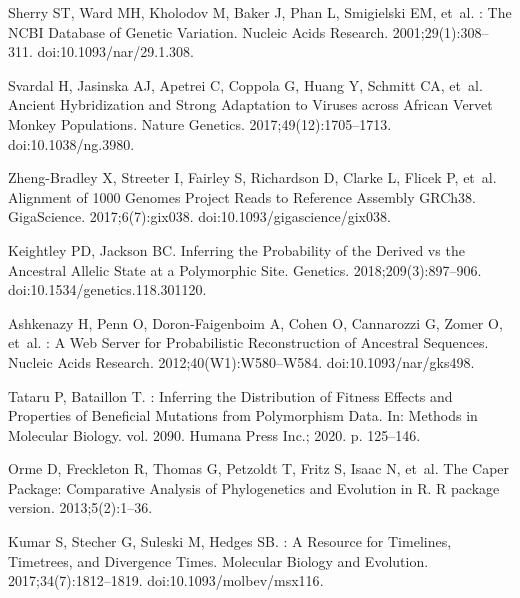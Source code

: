 \documentclass[10pt,letterpaper]{article}
\providecommand{\DIFdelbegin}{} %
\newcommand{\DIFscaledelfig}{0.5}
\newlength{\DIFdelgraphicswidth} %
\newlength{\DIFdelgraphicsheight} %
\newcommand{\DIFdelincludegraphics}[2][]{%
\sbox{\DIFdelgraphicsbox}{\DIFOincludegraphics[#1]{#2}}%
\settoboxwidth{\DIFdelgraphicswidth}{\DIFdelgraphicsbox} %
\settoboxtotalheight{\DIFdelgraphicsheight}{\DIFdelgraphicsbox} %
\scalebox{\DIFscaledelfig}{%
\parbox[b]{\DIFdelgraphicswidth}{\usebox{\DIFdelgraphicsbox}\\[-\baselineskip] \rule{\DIFdelgraphicswidth}{0em}}\llap{\resizebox{\DIFdelgraphicswidth}{\DIFdelgraphicsheight}{%
\setlength{\unitlength}{\DIFdelgraphicswidth}%
\begin{picture}(1,1)%
\thicklines\linethickness{2pt} %
{\color[rgb]{1,0,0}\put(0,0){\framebox(1,1){}}}%
{\color[rgb]{1,0,0}\put(0,0){\line( 1,1){1}}}%
{\color[rgb]{1,0,0}\put(0,1){\line(1,-1){1}}}%
\end{picture}%
}\hspace*{3pt}}} %
} %
\DeclareRobustCommand{\DIFdelbegin}{\DIFOdelbegin \let\includegraphics\DIFdelincludegraphics} %
\begin{document}
\begin{thebibliography}{10}
Sherry ST, Ward MH, Kholodov M, Baker J, Phan L, Smigielski EM, et~al.
: The {{NCBI}} Database of Genetic Variation.
\newblock Nucleic Acids Research. 2001;29(1):308--311.
\newblock doi:{10.1093/nar/29.1.308}.

Svardal H, Jasinska AJ, Apetrei C, Coppola G, Huang Y, Schmitt CA, et~al.
\newblock Ancient Hybridization and Strong Adaptation to Viruses across
{{African}} Vervet Monkey Populations.
\newblock Nature Genetics. 2017;49(12):1705--1713.
\newblock doi:{10.1038/ng.3980}.

{Zheng-Bradley} X, Streeter I, Fairley S, Richardson D, Clarke L, Flicek P,
et~al.
\newblock Alignment of 1000 {{Genomes Project}} Reads to Reference Assembly
{{GRCh38}}.
\newblock GigaScience. 2017;6(7):gix038.
\newblock doi:{10.1093/gigascience/gix038}.

Keightley PD, Jackson BC.
\newblock Inferring the Probability of the Derived vs the Ancestral Allelic
State at a Polymorphic Site.
\newblock Genetics. 2018;209(3):897--906.
\newblock doi:{10.1534/genetics.118.301120}.

Ashkenazy H, Penn O, {Doron-Faigenboim} A, Cohen O, Cannarozzi G, Zomer O,
et~al.
: A Web Server for Probabilistic Reconstruction of
Ancestral Sequences.
\newblock Nucleic Acids Research. 2012;40(W1):W580--W584.
\newblock doi:{10.1093/nar/gks498}.

Tataru P, Bataillon T.
: {{Inferring}} the Distribution of Fitness Effects and
Properties of Beneficial Mutations from Polymorphism Data.
\newblock In: Methods in {{Molecular Biology}}. vol. 2090. Humana Press Inc.;
2020. p. 125--146.

Orme D, Freckleton R, Thomas G, Petzoldt T, Fritz S, Isaac N, et~al.
\newblock The Caper Package: Comparative Analysis of Phylogenetics and
Evolution in {{R}}.
\newblock R package version. 2013;5(2):1--36.

Kumar S, Stecher G, Suleski M, Hedges SB.
: A Resource for Timelines, Timetrees, and Divergence
Times.
\newblock Molecular Biology and Evolution. 2017;34(7):1812--1819.
\newblock doi:{10.1093/molbev/msx116}.

\end{thebibliography}
\DIFdelbegin %
\end{document}
